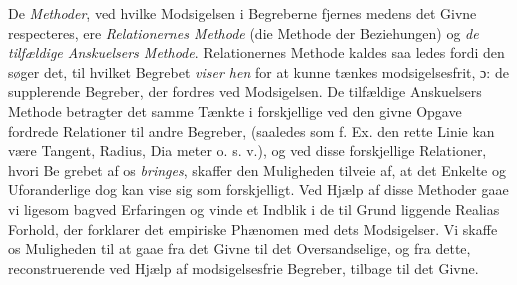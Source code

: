 \documentclass[12pt,a4paper]{book}
\begin{document}
De \emph{Methoder}, ved hvilke Modsigelsen i Begreberne
fjernes medens det Givne respecteres, ere \emph{Relationernes
Methode} (die Methode der Beziehungen) og \emph{de tilfældige
Anskuelsers Methode}. Relationernes Methode kaldes saa\-%
ledes fordi den søger det, til hvilket Begrebet \emph{viser hen} for
at kunne tænkes modsigelsesfrit, ɔ: de supplerende Begreber,
der fordres ved Modsigelsen. De tilfældige Anskuelsers
Methode betragter det samme Tænkte i forskjellige ved den
givne Opgave fordrede Relationer til andre Begreber, (saaledes
som f. Ex. den rette Linie kan være Tangent, Radius, Dia\-%
meter o. s. v.), og ved disse forskjellige Relationer, hvori Be\-%
grebet af os \emph{bringes}, skaffer den Muligheden tilveie af, at
det Enkelte og Uforanderlige dog kan vise sig som forskjelligt.
Ved Hjælp af disse Methoder gaae vi ligesom bagved Erfaringen
og vinde et Indblik i de til Grund liggende Realias Forhold,
der forklarer det empiriske Phænomen med dets Modsigelser.
Vi skaffe os Muligheden til at gaae fra det Givne til det
Oversandselige, og fra dette, reconstruerende ved Hjælp af
modsigelsesfrie Begreber, tilbage til det Givne.
\end{document}

